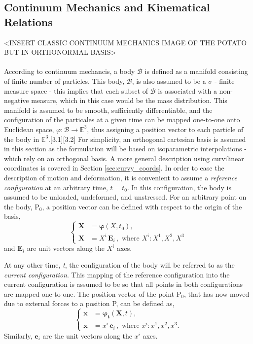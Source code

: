 \documentclass[../main.tex]{subfiles}
\begin{document}
\subsection{Continuum Mechanics and Kinematical Relations} \label{sec:continuum_kinematics}

<INSERT CLASSIC CONTINUUM MECHANICS IMAGE OF THE POTATO BUT IN ORTHONORMAL BASIS>
\\
\\
According to continuum mechancis, a body $\mathcal{B}$ is defined as a manifold consisting of finite number of particles.
 This body, $\mathcal{B}$, is also assumed to be a $\sigma$ - finite measure space - 
 this implies that each subset of $\mathcal{B}$ is associated with a non-negative measure, 
 which in this case would be the mass distribution.
 This manifold is assumed to be smooth, sufficiently differentiable, and the configuration of the particales at a given time
 can be mapped one-to-one onto Euclidean space, $\varphi: \mathcal{B} \rightarrow \mathbb{E}^{3}$, thus assigning a position vector to 
 each particle of the body in $\mathbb{E}^{3}$.[3.1][3.2] For simplicity, an orthogonal cartesian basis is assumed in this section as
 the formulation will be based on isoparametric interpolations - which rely on an orthogonal basis. A more general
 description using curvilinear coordinates is covered in Section \ref{sec:curvy_coords}. 
In order to ease the description of motion and deformation, it is convenient to assume a \emph{reference configuration}
 at an arbitrary time, $t = t_{0}$. In this configuration, the body is assumed to be unloaded, undeformed, and unstressed.
 For an arbitrary point on the body, $\mathrm{P}_{0}$, a position vector can be defined with respect to the origin of the basis,
\begin{equation}\label{ref_config_defition}
    \begin{cases}
        \boldsymbol{X} &= \boldsymbol{\varphi}(X, t_{0}),\\
        \boldsymbol{X} &= X^{i} \, \boldsymbol{E}_{i}\, , \, \, \text{where } {X}^{i}: {X}^{1}, {X}^{2}, {X}^{3} 
    \end{cases}
    \end{equation}
and $\boldsymbol{E}_{i}$ are unit vectors along the ${X}^{i}$ axes.

At any other time, \emph{t}, the configuration of the body will be referred to as the \emph{current configuration}.
 This mapping of the reference configuration into the current configuration is assumed to be so that all points in
 both configurations are mapped one-to-one. The position vector of the point $\mathrm{P}_{0}$,
 that has now moved due to external forces to a position P, can be defined as,
\begin{equation} \label{curr_config_definition}
    \begin{cases}
        \boldsymbol{{x}} &= \boldsymbol{\varphi_{t}}(\boldsymbol{X}, t), \\
        \boldsymbol{{x}} &= {x}^{i} \, \boldsymbol{{e}}_{{i}}\, , \, \, \text{where } {x}^{i}: {x}^{1}, {x}^{2}, {x}^{3}.
    \end{cases}
\end{equation}
Similarly, $\boldsymbol{{e}}_{{i}}$ are the unit vectors
 along the ${x}^{i}$ axes.
\end{document}
